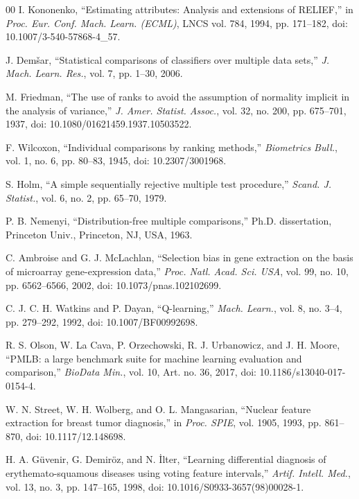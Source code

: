 \begin{thebibliography}{00}
 I. Kononenko, ``Estimating attributes: Analysis and extensions of RELIEF,'' in \textit{Proc. Eur. Conf. Mach. Learn. (ECML)}, LNCS vol. 784, 1994, pp. 171--182, doi: 10.1007/3-540-57868-4\_57.

 J. Dem\v{s}ar, ``Statistical comparisons of classifiers over multiple data sets,'' \textit{J. Mach. Learn. Res.}, vol. 7, pp. 1--30, 2006.

 M. Friedman, ``The use of ranks to avoid the assumption of normality implicit in the analysis of variance,'' \textit{J. Amer. Statist. Assoc.}, vol. 32, no. 200, pp. 675--701, 1937, doi: 10.1080/01621459.1937.10503522.

 F. Wilcoxon, ``Individual comparisons by ranking methods,'' \textit{Biometrics Bull.}, vol. 1, no. 6, pp. 80--83, 1945, doi: 10.2307/3001968.

 S. Holm, ``A simple sequentially rejective multiple test procedure,'' \textit{Scand. J. Statist.}, vol. 6, no. 2, pp. 65--70, 1979.

 P. B. Nemenyi, ``Distribution-free multiple comparisons,'' Ph.D. dissertation, Princeton Univ., Princeton, NJ, USA, 1963.

 C. Ambroise and G. J. McLachlan, ``Selection bias in gene extraction on the basis of microarray gene-expression data,'' \textit{Proc. Natl. Acad. Sci. USA}, vol. 99, no. 10, pp. 6562--6566, 2002, doi: 10.1073/pnas.102102699.


 C. J. C. H. Watkins and P. Dayan, ``Q-learning,'' \textit{Mach. Learn.}, vol. 8, no. 3--4, pp. 279--292, 1992, doi: 10.1007/BF00992698.

 R. S. Olson, W. La Cava, P. Orzechowski, R. J. Urbanowicz, and J. H. Moore, ``PMLB: a large benchmark suite for machine learning evaluation and comparison,'' \textit{BioData Min.}, vol. 10, Art. no. 36, 2017, doi: 10.1186/s13040-017-0154-4.

 W. N. Street, W. H. Wolberg, and O. L. Mangasarian, ``Nuclear feature extraction for breast tumor diagnosis,'' in \textit{Proc. SPIE}, vol. 1905, 1993, pp. 861--870, doi: 10.1117/12.148698.

 H. A. G\"uvenir, G. Demir\"oz, and N. \.Ilter, ``Learning differential diagnosis of erythemato-squamous diseases using voting feature intervals,'' \textit{Artif. Intell. Med.}, vol. 13, no. 3, pp. 147--165, 1998, doi: 10.1016/S0933-3657(98)00028-1.


\end{thebibliography}
